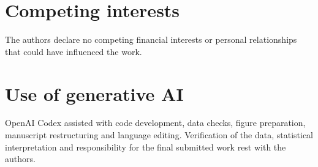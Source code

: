 \documentclass[11pt]{article}
\begin{document}
\section*{Competing interests}
The authors declare no competing financial interests or personal relationships that could have influenced the work.

\section*{Use of generative AI}
OpenAI Codex assisted with code development, data checks, figure preparation, manuscript restructuring and language editing. Verification of the data, statistical interpretation and responsibility for the final submitted work rest with the authors.



\end{document}
